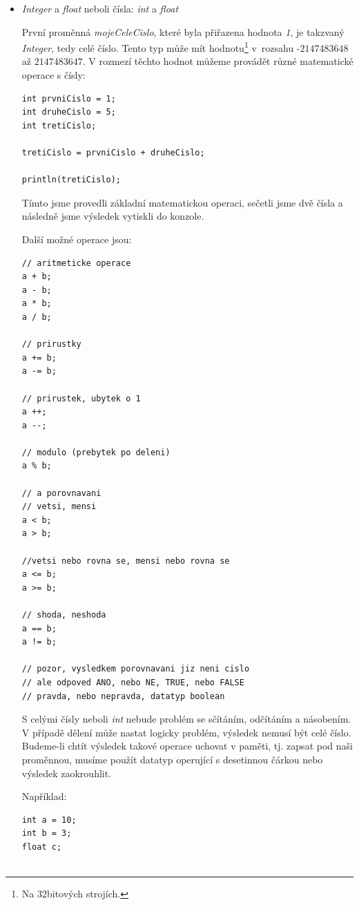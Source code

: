 \documentclass[10pt,twoside=true,open=right,cleardoublepage=empty,chapterprefix=true]{scrbook}
\newcommand{\poznamka}[1]{\footnote{\/ #1}}
\newcommand{\lnb}{\linebreak}
\begin{document}
\begin{itemize}


\item{{\em Integer} a {\em float} neboli čísla: {\em int} a {\em float}}

První proměnná {\em mojeCeleCislo}, které byla přiřazena hodnota {\em 1}, je takzvaný {\em Integer}, tedy celé číslo. Tento typ může mít hodnotu\poznamka{Na 32bitových strojích.} v~rozsahu -$2147483648$ až $2147483647$. V rozmezí těchto hodnot můžeme provádět různé matematické operace s čísly:

\begin{lstlisting}
int prvniCislo = 1;
int druheCislo = 5;
int tretiCislo;

tretiCislo = prvniCislo + druheCislo;

println(tretiCislo);
\end{lstlisting}

Tímto jsme provedli základní matematickou operaci, sečetli jsme dvě čísla a následně jsme výsledek vytiskli do konzole.

\pagebreak

Další možné operace jsou:

\begin{lstlisting}
// aritmeticke operace
a + b;
a - b;
a * b;
a / b;

// prirustky
a += b;
a -= b;

// prirustek, ubytek o 1
a ++;
a --;

// modulo (prebytek po deleni)
a % b;

// a porovnavani
// vetsi, mensi
a < b;
a > b;

//vetsi nebo rovna se, mensi nebo rovna se
a <= b;
a >= b;

// shoda, neshoda
a == b;
a != b;

// pozor, vysledkem porovnavani jiz neni cislo
// ale odpoved ANO, nebo NE, TRUE, nebo FALSE
// pravda, nebo nepravda, datatyp boolean

\end{lstlisting}

S celými čísly neboli {\em int} nebude problém se sčítáním, odčítáním \lnb a násobením. V případě dělení může nastat logicky problém, výsledek nemusí být celé číslo. Budeme-li chtít výsledek takové operace uchovat v paměti, tj. zapsat pod naši proměnnou, musíme použít datatyp operující s desetinnou čárkou nebo výsledek zaokrouhlit.

\pagebreak
Například:

\begin{lstlisting}
int a = 10;
int b = 3;
float c;


\end{lstlisting}
\end{itemize}
\end{document}
